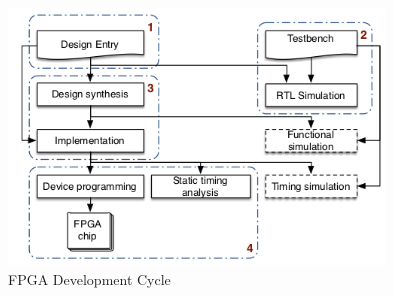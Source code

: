 \begin{figure}[htbp]
	\centering
		\includegraphics[width=10cm]{Figures/FPGACycle.png}
	\caption[FPGA Development Cycle]{FPGA Development Cycle \cite{XuanSang2014}}
	\label{fig:FPGACycle}
\end{figure}

